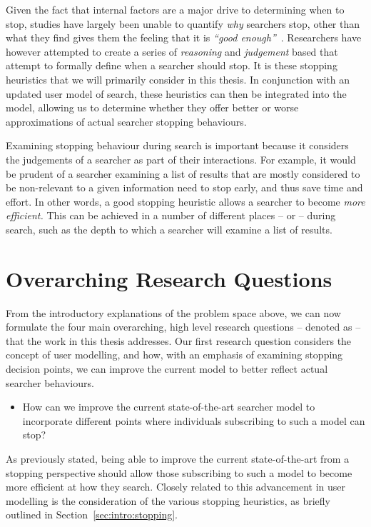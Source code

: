 Given the fact that internal factors are a major drive to determining when to stop, studies have largely been unable to quantify \emph{why} searchers stop, other than what they find gives them the feeling that it is \emph{``good enough''}~\citep{zach2005enough_is_enough}. Researchers have however attempted to create a series of \emph{reasoning} and \emph{judgement} based  that attempt to formally define when a searcher should stop. It is these stopping heuristics that we will primarily consider in this thesis. In conjunction with an updated user model of search, these heuristics can then be integrated into the model, allowing us to determine whether they offer better or worse approximations of actual searcher stopping behaviours.

Examining stopping behaviour during search is important because it considers the judgements of a searcher as part of their interactions. For example, it would be prudent of a searcher examining a list of results that are mostly considered to be non-relevant to a given information need to stop early, and thus save time and effort. In other words, a good stopping heuristic allows a searcher to become \emph{more efficient.} This can be achieved in a number of different places -- or  -- during search, such as the depth to which a searcher will examine a list of results.

\section{Overarching Research Questions}\label{sec:intro:rqs}
From the introductory explanations of the problem space above, we can now formulate the four main overarching, high level research questions -- denoted as  -- that the work in this thesis addresses. Our first research question considers the concept of user modelling, and how, with an emphasis of examining stopping decision points, we can improve the current model to better reflect actual searcher behaviours.

\begin{itemize}
    \item[]{ How can we improve the current state-of-the-art searcher model to incorporate different points where individuals subscribing to such a model can stop?}
\end{itemize}

As previously stated, being able to improve the current state-of-the-art from a stopping perspective should allow those subscribing to such a model to become more efficient at how they search. Closely related to this advancement in user modelling is the consideration of the various stopping heuristics, as briefly outlined in Section~\ref{sec:intro:stopping}.

